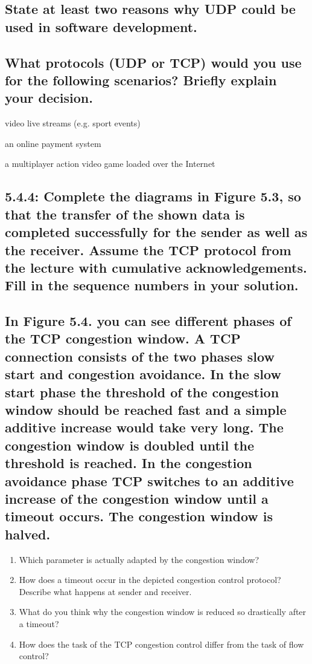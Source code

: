 \documentclass[a4paper,
			llpt,
			solution,
			accentcolor=tud2d,
			colorbacktitle
			]
			{tudexercise}
\begin{document}
\subsection{State at least two reasons why UDP could be used in software development.}
\subsection{What protocols (UDP or TCP) would you use for the following scenarios? Briefly explain your decision.}
\begin{compactenum}
\item video live streams (e.g. sport events)
\item an online payment system
\item a multiplayer action video game loaded over the Internet
\end{compactenum}
\subsection{5.4.4: Complete the diagrams in Figure 5.3, so that the transfer of the shown data is completed successfully for the sender as well as the receiver. Assume the TCP protocol from the lecture with cumulative acknowledgements. Fill in the sequence numbers in your solution.}
\subsection{In Figure 5.4. you can see different phases of the TCP congestion window. A TCP connection consists of the two phases slow start and congestion avoidance. In the slow start phase the threshold of the congestion window should be reached fast and a simple additive increase would take very long. The congestion window is doubled until the threshold is reached. In the congestion avoidance phase TCP switches to an additive increase of the congestion window until a timeout occurs. The congestion window is halved.}
\begin{enumerate}
\item Which parameter is actually adapted by the congestion window?
\item How does a timeout occur in the depicted congestion control protocol? Describe what
happens at sender and receiver.
\item What do you think why the congestion window is reduced so drastically after a timeout?
\item How does the task of the TCP congestion control differ from the task of flow control?
\end{enumerate}
\end{document}
